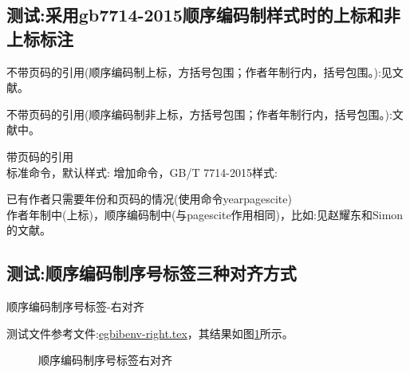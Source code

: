 \subsection{测试:采用gb7714-2015顺序编码制样式时的上标和非上标标注}\label{sec:cite:cmd:test}
\begin{refsection}
不带页码的引用(顺序编码制上标，方括号包围；作者年制行内，括号包围。):见文献\cite{Peebles2001-100-100}。

不带页码的引用(顺序编码制非上标，方括号包围；作者年制行内，括号包围。):文献\parencite{Miroslav2004--}中。

带页码的引用\\
标准命令，默认样式:\cite[见][49页]{蔡敏2006--}\parencite[见][49页]{Miroslav2004--}
增加命令，GB/T 7714-2015样式:

已有作者只需要年份和页码的情况(使用命令yearpagescite)\\
作者年制中(上标)，顺序编码制中(与pagescite作用相同)，比如:见赵耀东和Simon的文献。

\printbibliography[heading=bibliography,title=【gb7714-2015顺序编码制上标和非上标标注测试】]
\end{refsection}

\subsection{测试:顺序编码制序号标签三种对齐方式}\label{sec:align:test}
顺序编码制序号标签-右对齐

测试文件参考文件:\href{run:./egbibenv-right.tex}{egbibenv-right.tex}，其结果如图\ref{bib:env:right}所示。
\begin{figure}[!htb]
  \centering
  \caption{顺序编码制序号标签右对齐}\label{bib:env:right}
\end{figure}


